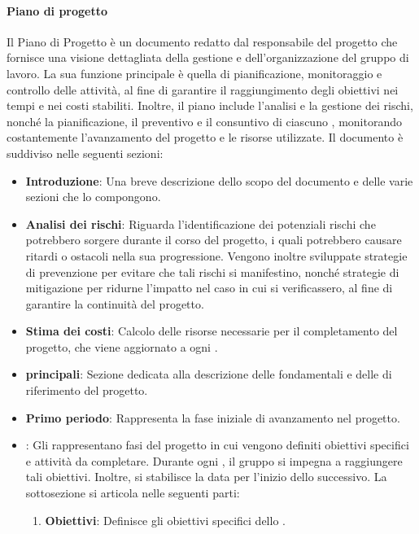 \paragraph{Piano di progetto}
Il Piano di Progetto è un documento redatto dal responsabile del progetto che fornisce una visione dettagliata della gestione e dell’organizzazione del gruppo di lavoro. La sua funzione principale è quella di pianificazione, monitoraggio e controllo delle attività, al fine di garantire il raggiungimento degli obiettivi nei tempi e nei costi stabiliti. Inoltre, il piano include l'analisi e la gestione dei rischi, nonché la pianificazione, il preventivo e il consuntivo di ciascuno , monitorando costantemente l'avanzamento del progetto e le risorse utilizzate.
Il documento è suddiviso nelle seguenti sezioni:
\begin{itemize}
    \item \textbf{Introduzione}: Una breve descrizione dello scopo del documento e delle varie sezioni che lo compongono.
    \item \textbf{Analisi dei rischi}: Riguarda l'identificazione dei potenziali rischi che potrebbero sorgere durante il corso del progetto, i quali potrebbero causare ritardi o ostacoli nella sua progressione. Vengono inoltre sviluppate strategie di prevenzione per evitare che tali rischi si manifestino, nonché strategie di mitigazione per ridurne l'impatto nel caso in cui si verificassero, al fine di garantire la continuità del progetto.
    \item \textbf{Stima dei costi}: Calcolo delle risorse necessarie per il completamento del progetto, che viene aggiornato a ogni .
    \item \textbf{ principali}: Sezione dedicata alla descrizione delle  fondamentali e delle  di riferimento del progetto.
    \item \textbf{Primo periodo}: Rappresenta la fase iniziale di avanzamento nel progetto.
    \item \textbf{}: Gli  rappresentano fasi del progetto in cui vengono definiti obiettivi specifici e attività da completare. Durante ogni , il gruppo si impegna a raggiungere tali obiettivi. Inoltre, si stabilisce la data per l'inizio dello  successivo.
    La sottosezione si articola nelle seguenti parti:
    \begin{enumerate}
        \item \textbf{Obiettivi}: Definisce gli obiettivi specifici dello .

\end{enumerate}
\end{itemize}
